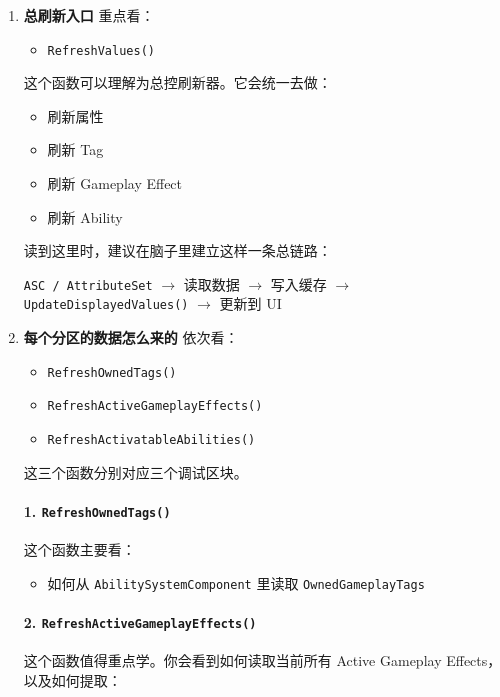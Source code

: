 \begin{enumerate}
	本质上，这里就是在手动搭一棵 Widget Tree。
	
	\item \textbf{总刷新入口}
	重点看：
	
	\begin{itemize}
		\item \texttt{RefreshValues()}
	\end{itemize}
	
	这个函数可以理解为总控刷新器。它会统一去做：
	
	\begin{itemize}
		\item 刷新属性
		\item 刷新 Tag
		\item 刷新 Gameplay Effect
		\item 刷新 Ability
	\end{itemize}
	
	读到这里时，建议在脑子里建立这样一条总链路：
	
	\begin{center}
		\texttt{ASC / AttributeSet} $\rightarrow$ 读取数据 $\rightarrow$ 写入缓存 $\rightarrow$ \texttt{UpdateDisplayedValues()} $\rightarrow$ 更新到 UI
	\end{center}
	
	\item \textbf{每个分区的数据怎么来的}
	依次看：
	
	\begin{itemize}
		\item \texttt{RefreshOwnedTags()}
		\item \texttt{RefreshActiveGameplayEffects()}
		\item \texttt{RefreshActivatableAbilities()}
	\end{itemize}
	
	这三个函数分别对应三个调试区块。
	
	\paragraph{1. \texttt{RefreshOwnedTags()}}
	这个函数主要看：
	
	\begin{itemize}
		\item 如何从 \texttt{AbilitySystemComponent} 里读取 \texttt{OwnedGameplayTags}
	\end{itemize}
	
	\paragraph{2. \texttt{RefreshActiveGameplayEffects()}}
	这个函数值得重点学。你会看到如何读取当前所有 Active Gameplay Effects，以及如何提取：
	

\end{enumerate}
